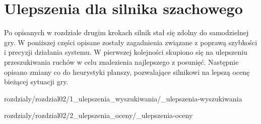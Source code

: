 \chapter{Ulepszenia dla silnika szachowego}
\label{ch:implementacja-silnika-szachowego}

Po opisanych w rozdziale drugim krokach silnik stał się zdolny do samodzielnej gry.
W poniższej części opisane zostały zagadnienia związane z poprawą szybkości i precyzji działania systemu.
W pierwszej kolejności skupiono się na ulepszeniu przeszukiwania ruchów w celu znalezienia najlepszego z posunięć.
Następnie opisano zmiany co do heurystyki planszy, pozwalające silnikowi na lepszą ocenę bieżącej sytuacji gry.

 {rozdzialy/rozdzial02/1_ulepszenia_wyszukiwania/_ulepszenia-wyszukiwania}

 {rozdzialy/rozdzial02/2_ulepszenia_oceny/_ulepszenia-oceny}

